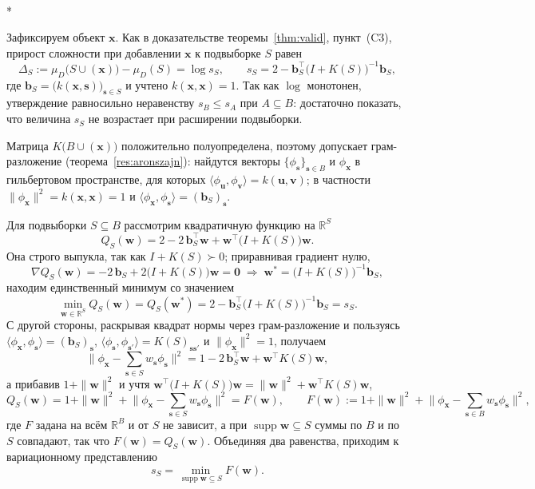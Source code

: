 \documentclass[14pt, a4paper]{extarticle}
\makeatletter
\theoremstyle{definition}
\theoremstyle{plain}
\renewenvironment{proof}[1][\proofname]{\par
    \pushQED{\qed}%
    \normalfont \topsep6\p@\@plus6\p@\relax
    \trivlist
    \item[\hskip\labelsep\itshape #1\@addpunct{.}]\mbox{}\\*
    \ignorespaces
}{\popQED\endtrivlist\@endpefalse}
\makeatother
\begin{document}
\begin{proof}[Доказательство следствия~\ref{cor:submodular}]
Зафиксируем объект $\mathbf{x}$. Как в доказательстве теоремы~\ref{thm:valid},
пункт~(C3), прирост сложности при добавлении $\mathbf{x}$ к подвыборке $S$ равен
\[
    \Delta_S := \mu_D\big(S\cup(\mathbf{x})\big)-\mu_D(S)=\log s_S,
    \qquad
    s_S=2-\mathbf{b}_S^{\!\top}\big(I+K(S)\big)^{-1}\mathbf{b}_S,
\]
где $\mathbf{b}_S=\big(k(\mathbf{x},\mathbf{s})\big)_{\mathbf{s}\in S}$ и учтено
$k(\mathbf{x},\mathbf{x})=1$. Так как $\log$ монотонен, утверждение равносильно
неравенству $s_B\le s_A$ при $A\subseteq B$: достаточно показать, что величина
$s_S$ не возрастает при расширении подвыборки.

Матрица $K\big(B\cup(\mathbf{x})\big)$ положительно полуопределена, поэтому
допускает грам-разложение (теорема~\ref{res:aronszajn}): найдутся векторы
$\{\phi_{\mathbf{s}}\}_{\mathbf{s}\in B}$ и $\phi_{\mathbf{x}}$ в гильбертовом
пространстве, для которых
$\langle\phi_{\mathbf{u}},\phi_{\mathbf{v}}\rangle=k(\mathbf{u},\mathbf{v})$; в
частности $\|\phi_{\mathbf{x}}\|^2=k(\mathbf{x},\mathbf{x})=1$ и
$\langle\phi_{\mathbf{x}},\phi_{\mathbf{s}}\rangle=(\mathbf{b}_S)_{\mathbf{s}}$.

Для подвыборки $S\subseteq B$ рассмотрим квадратичную функцию на $\mathbb{R}^{S}$
\[
    Q_S(\mathbf{w})
    =2-2\,\mathbf{b}_S^{\!\top}\mathbf{w}
      +\mathbf{w}^{\!\top}\big(I+K(S)\big)\mathbf{w} .
\]
Она строго выпукла, так как $I+K(S)\succ0$; приравнивая градиент нулю,
\[
    \nabla Q_S(\mathbf{w})=-2\,\mathbf{b}_S+2\big(I+K(S)\big)\mathbf{w}=\mathbf{0}
    \;\Longrightarrow\;
    \mathbf{w}^\ast=\big(I+K(S)\big)^{-1}\mathbf{b}_S ,
\]
находим единственный минимум со значением
\[
    \min_{\mathbf{w}\in\mathbb{R}^{S}}Q_S(\mathbf{w})
    =Q_S(\mathbf{w}^\ast)
    =2-\mathbf{b}_S^{\!\top}\big(I+K(S)\big)^{-1}\mathbf{b}_S
    =s_S .
\]
С другой стороны, раскрывая квадрат нормы через грам-разложение и пользуясь
$\langle\phi_{\mathbf{x}},\phi_{\mathbf{s}}\rangle=(\mathbf{b}_S)_{\mathbf{s}}$,
$\langle\phi_{\mathbf{s}},\phi_{\mathbf{s}'}\rangle=K(S)_{\mathbf{s}\mathbf{s}'}$ и
$\|\phi_{\mathbf{x}}\|^2=1$, получаем
\[
    \Big\|\phi_{\mathbf{x}}-\sum_{\mathbf{s}\in S}w_{\mathbf{s}}\phi_{\mathbf{s}}\Big\|^2
    =1-2\,\mathbf{b}_S^{\!\top}\mathbf{w}+\mathbf{w}^{\!\top}K(S)\mathbf{w} ,
\]
а прибавив $1+\|\mathbf{w}\|^2$ и учтя
$\mathbf{w}^{\!\top}\big(I+K(S)\big)\mathbf{w}=\|\mathbf{w}\|^2+\mathbf{w}^{\!\top}K(S)\mathbf{w}$,
\[
    Q_S(\mathbf{w})
    =1+\|\mathbf{w}\|^2
      +\Big\|\phi_{\mathbf{x}}-\sum_{\mathbf{s}\in S}w_{\mathbf{s}}\phi_{\mathbf{s}}\Big\|^2
    =F(\mathbf{w}),
    \qquad
    F(\mathbf{w}):=1+\|\mathbf{w}\|^2
      +\Big\|\phi_{\mathbf{x}}-\sum_{\mathbf{s}\in B}w_{\mathbf{s}}\phi_{\mathbf{s}}\Big\|^2 ,
\]
где $F$ задана на всём $\mathbb{R}^{B}$ и от $S$ не зависит, а при
$\operatorname{supp}\mathbf{w}\subseteq S$ суммы по $B$ и по $S$ совпадают, так что
$F(\mathbf{w})=Q_S(\mathbf{w})$. Объединяя два равенства, приходим к вариационному
представлению
\[
    s_S=\min_{\operatorname{supp}\mathbf{w}\subseteq S}F(\mathbf{w}) .
\]


\end{proof}
\end{document}
